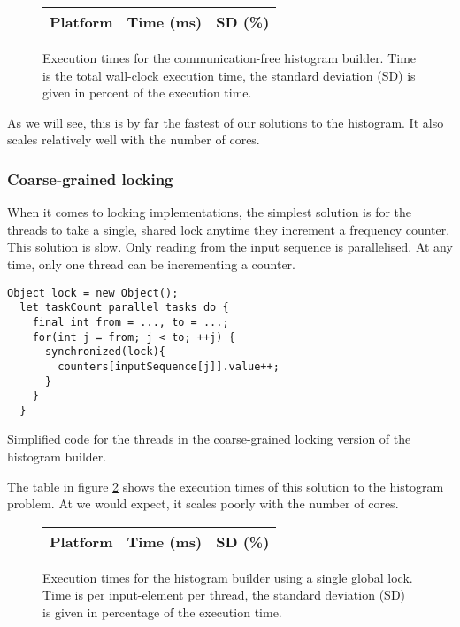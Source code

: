 \begin{figure}[hbtp]
	\centering
	\begin{tabular}{l r r}
		\hline
		\hline
		Platform & Time (ms) & SD (\%) \\
		\hline
		
		\hline
		\hline
	\end{tabular}
	\caption{Execution times for the communication-free histogram builder. Time
is the total wall-clock execution time, the standard deviation (SD) is given in
percent of the execution time.} \label{table:histo-lockfree}
\end{figure}

As we will see, this is by far the fastest of our solutions to the histogram. It
also scales relatively well with the number of cores.

\subsubsection{Coarse-grained locking}
When it comes to locking implementations, the simplest solution is for the
threads to take a single, shared lock anytime they increment a frequency
counter. This solution is slow. Only reading from the input sequence is
parallelised. At any time, only one thread can be incrementing a counter.

\begin{code}
\begin{Verbatim}[frame=single]
  Object lock = new Object();
  let taskCount parallel tasks do {
    final int from = ..., to = ...;
    for(int j = from; j < to; ++j) {
      synchronized(lock){
        counters[inputSequence[j]].value++;
      }
    }
  }
\end{Verbatim}
	\caption{Simplified code for the threads in the coarse-grained locking
	version of the histogram builder.}
\end{code}

The table in figure \ref{table:histo-global} shows the execution times of this
solution to the histogram problem. At we would expect, it scales poorly with the number of cores.

\begin{figure}[hbtp]
	\centering
	\begin{tabular}{l r r}
		\hline
		\hline
		Platform & Time (ms) & SD (\%) \\
		\hline
		
		\hline
		\hline
	\end{tabular}
	\caption{Execution times for the histogram builder using a single
global lock. Time is per input-element per thread, the standard deviation (SD)
is given in percentage of the execution time.}
	\label{table:histo-global}
\end{figure}

